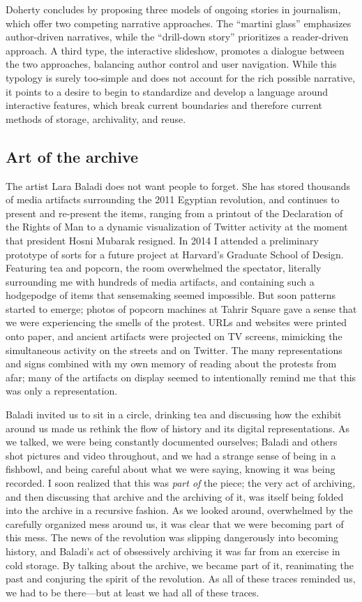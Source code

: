 Doherty concludes by proposing three models of ongoing stories in journalism, which offer two competing narrative approaches. The ``martini glass'' emphasizes author-driven narratives, while the ``drill-down story'' prioritizes a reader-driven approach. A third type, the interactive slideshow, promotes a dialogue between the two approaches, balancing author control and user navigation. While this typology is surely too-simple and does not account for the rich possible narrative, it points to a desire to begin to standardize and develop a language around interactive features, which break current boundaries and therefore current methods of storage, archivality, and reuse.

\subsection{Art of the archive}

The artist Lara Baladi does not want people to forget. She has stored thousands of media artifacts surrounding the 2011 Egyptian revolution, and continues to present and re-present the items, ranging from a printout of the Declaration of the Rights of Man to a dynamic visualization of Twitter activity at the moment that president Hosni Mubarak resigned. In 2014 I attended a preliminary prototype of sorts for a future project at Harvard's Graduate School of Design. Featuring tea and popcorn, the room overwhelmed the spectator, literally surrounding me with hundreds of media artifacts, and containing such a hodgepodge of items that sensemaking seemed impossible. But soon patterns started to emerge; photos of popcorn machines at Tahrir Square gave a sense that we were experiencing the smells of the protest. URLs and websites were printed onto paper, and ancient artifacts were projected on TV screens, mimicking the simultaneous activity on the streets and on Twitter. The many representations and signs combined with my own memory of reading about the protests from afar; many of the artifacts on display seemed to intentionally remind me that this was only a representation.

Baladi invited us to sit in a circle, drinking tea and discussing how the exhibit around us made us rethink the flow of history and its digital representations. As we talked, we were being constantly documented ourselves; Baladi and others shot pictures and video throughout, and we had a strange sense of being in a fishbowl, and being careful about what we were saying, knowing it was being recorded. I soon realized that this was \emph{part of} the piece; the very act of archiving, and then discussing that archive and the archiving of it, was itself being folded into the archive in a recursive fashion. As we looked around, overwhelmed by the carefully organized mess around us, it was clear that we were becoming part of this mess. The news of the revolution was slipping dangerously into becoming history, and Baladi's act of obsessively archiving it was far from an exercise in cold storage. By talking about the archive, we became part of it, reanimating the past and conjuring the spirit of the revolution. As all of these traces reminded us, we had to be there---but at least we had all of these traces.



